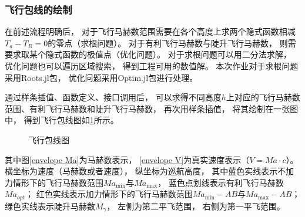 \subsubsection{飞行包线的绘制}

在前述流程明确后，
对于飞行马赫数范围需要在各个高度上求两个隐式函数相减$T_a-T_R=0$的零点（求根问题）。
对于有利飞行马赫数与陡升飞行马赫数，
则需要求取某个隐式函数的极值点（优化问题）。
对于求根问题可以用二分法求解，
优化问题也可以遍历区域搜索，
得到工程可用的数值解。
本次作业对于求根问题采用Roots.jl包，
优化问题采用Optim.jl包进行处理。

通过样条插值、函数定义、接口调用后，
可以求得不同高度$h$上对应的飞行马赫数范围、有利飞行马赫数和陡升飞行马赫数，
再次用样条插值，
将其绘制在一张图中，
得到飞行包线图如\ref{飞行包线图}所示。

\begin{figure}[H]
    \centering
    \caption{飞行包线图}
    \label{飞行包线图}
\end{figure}

其中图\ref{envelope Ma}为马赫数表示，
\ref{envelope V}为真实速度表示（$V=Ma\cdot c$）。
横坐标为速度（马赫数或者速度），
纵坐标为巡航高度，
其中蓝色实线表示不加力情形下的飞行马赫数范围$Ma_{\min}$与$Ma_{\max}$，
蓝色点划线表示有利飞行马赫数$Ma_{opt}$；
红色实线表示加力情形下的飞行马赫数范围$Ma_{\min}-AB$与$Ma_{\max}-AB$；
绿色实线表示陡升马赫数$M_{\gamma}$，
左侧为第二平飞范围，
右侧为第一平飞范围。

